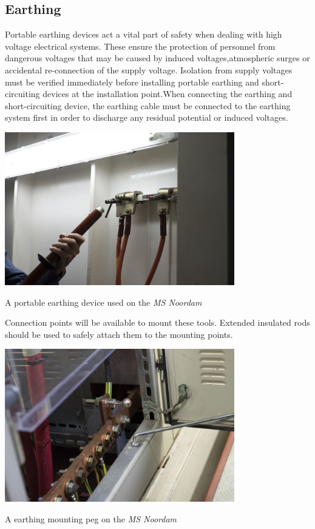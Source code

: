 \documentclass[11pt,a4paper]{article}
\begin{document}
\subsection{Earthing}
Portable earthing devices act a vital part of safety when dealing with high voltage electrical systems. These ensure the protection of personnel  from  dangerous  voltages  that  may  be  caused  by  induced  voltages,atmospheric surges or accidental re-connection of the supply voltage. Isolation  from  supply  voltages  must  be  verified  immediately  before installing portable earthing and short-circuiting devices at the installation point.When  connecting  the  earthing  and  short-circuiting  device, the  earthing cable must be connected to the earthing system first in order to discharge any residual potential or induced voltages.
\begin{center}
  \includegraphics[width=10cm]{noordampeg.jpg}\par
  A portable earthing device used on the \textit{MS Noordam}
  \end{center}
Connection points will be available to mount these tools. Extended insulated rods should be used to safely attach them to the mounting points.
\begin{center}
  \includegraphics[width=10cm]{peg.jpg}\par
  A earthing mounting peg on the \textit{MS Noordam}
  \end{center}
\end{document}
